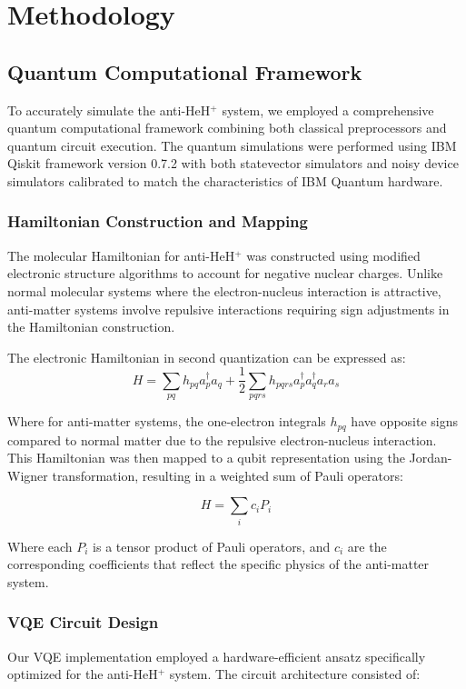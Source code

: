 \documentclass[10pt,twocolumn,a4paper]{article}
\begin{document}
\section{Methodology}
\subsection{Quantum Computational Framework}
To accurately simulate the anti-HeH$^+$ system, we employed a comprehensive quantum computational framework combining both classical preprocessors and quantum circuit execution. The quantum simulations were performed using IBM Qiskit framework version 0.7.2 with both statevector simulators and noisy device simulators calibrated to match the characteristics of IBM Quantum hardware.

\subsubsection{Hamiltonian Construction and Mapping}
The molecular Hamiltonian for anti-HeH$^+$ was constructed using modified electronic structure algorithms to account for negative nuclear charges. Unlike normal molecular systems where the electron-nucleus interaction is attractive, anti-matter systems involve repulsive interactions requiring sign adjustments in the Hamiltonian construction.

The electronic Hamiltonian in second quantization can be expressed as:
\begin{equation}
    H = \sum_{pq} h_{pq} a_p^\dagger a_q + \frac{1}{2}\sum_{pqrs} h_{pqrs} a_p^\dagger a_q^\dagger a_r a_s
\end{equation}

Where for anti-matter systems, the one-electron integrals $h_{pq}$ have opposite signs compared to normal matter due to the repulsive electron-nucleus interaction. This Hamiltonian was then mapped to a qubit representation using the Jordan-Wigner transformation, resulting in a weighted sum of Pauli operators:

\begin{equation}
    H = \sum_i c_i P_i
\end{equation}

Where each $P_i$ is a tensor product of Pauli operators, and $c_i$ are the corresponding coefficients that reflect the specific physics of the anti-matter system.

\subsubsection{VQE Circuit Design}
Our VQE implementation employed a hardware-efficient ansatz specifically optimized for the anti-HeH$^+$ system. The circuit architecture consisted of:
\end{document}
